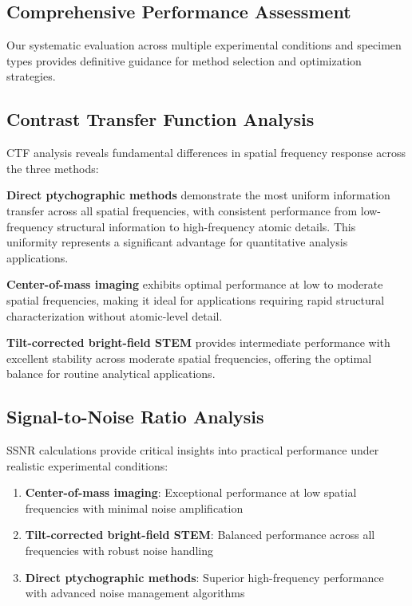 \documentclass[
  letterpaper,
]{article}
\providecommand{\tightlist}{%
  \setlength{\itemsep}{0pt}\setlength{\parskip}{0pt}}
\begin{document}
\subsection{Comprehensive Performance
Assessment}\label{comprehensive-performance-assessment}

Our systematic evaluation across multiple experimental conditions and
specimen types provides definitive guidance for method selection and
optimization strategies.

\subsection{Contrast Transfer Function
Analysis}\label{contrast-transfer-function-analysis}

CTF analysis reveals fundamental differences in spatial frequency
response across the three methods:

\textbf{Direct ptychographic methods} demonstrate the most uniform
information transfer across all spatial frequencies, with consistent
performance from low-frequency structural information to high-frequency
atomic details. This uniformity represents a significant advantage for
quantitative analysis applications.

\textbf{Center-of-mass imaging} exhibits optimal performance at low to
moderate spatial frequencies, making it ideal for applications requiring
rapid structural characterization without atomic-level detail.

\textbf{Tilt-corrected bright-field STEM} provides intermediate
performance with excellent stability across moderate spatial
frequencies, offering the optimal balance for routine analytical
applications.

\subsection{Signal-to-Noise Ratio
Analysis}\label{signal-to-noise-ratio-analysis}

SSNR calculations provide critical insights into practical performance
under realistic experimental conditions:

\begin{enumerate}
\def\labelenumi{\arabic{enumi}.}
\tightlist
\item
  \textbf{Center-of-mass imaging}: Exceptional performance at low
  spatial frequencies with minimal noise amplification
\item
  \textbf{Tilt-corrected bright-field STEM}: Balanced performance across
  all frequencies with robust noise handling
\item
  \textbf{Direct ptychographic methods}: Superior high-frequency
  performance with advanced noise management algorithms
\end{enumerate}
\end{document}
